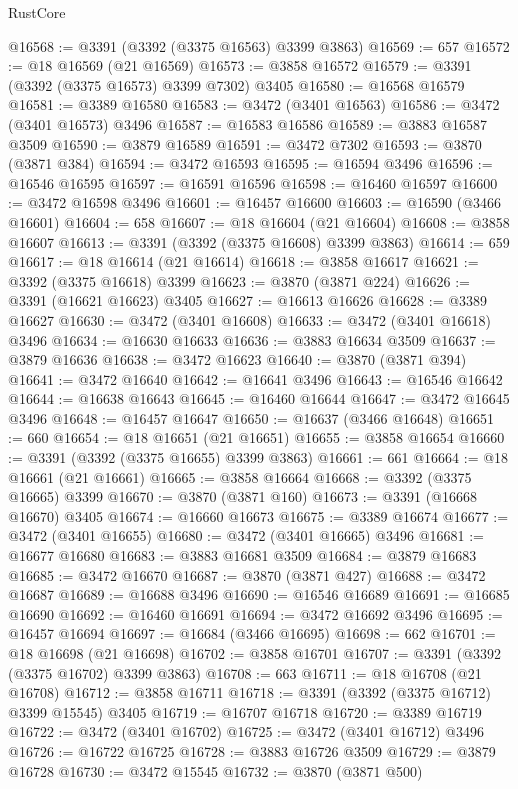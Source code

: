 \begin{lexlean}{RustCore}
\begin{coremodule}
@16568 := @3391 (@3392 (@3375 @16563) @3399 @3863)
@16569 := 657
@16572 := @18 @16569 (@21 @16569)
@16573 := @3858 @16572
@16579 := @3391 (@3392 (@3375 @16573) @3399 @7302) @3405
@16580 := @16568 @16579
@16581 := @3389 @16580
@16583 := @3472 (@3401 @16563)
@16586 := @3472 (@3401 @16573) @3496
@16587 := @16583 @16586
@16589 := @3883 @16587 @3509
@16590 := @3879 @16589
@16591 := @3472 @7302
@16593 := @3870 (@3871 @384)
@16594 := @3472 @16593
@16595 := @16594 @3496
@16596 := @16546 @16595
@16597 := @16591 @16596
@16598 := @16460 @16597
@16600 := @3472 @16598 @3496
@16601 := @16457 @16600
@16603 := @16590 (@3466 @16601)
@16604 := 658
@16607 := @18 @16604 (@21 @16604)
@16608 := @3858 @16607
@16613 := @3391 (@3392 (@3375 @16608) @3399 @3863)
@16614 := 659
@16617 := @18 @16614 (@21 @16614)
@16618 := @3858 @16617
@16621 := @3392 (@3375 @16618) @3399
@16623 := @3870 (@3871 @224)
@16626 := @3391 (@16621 @16623) @3405
@16627 := @16613 @16626
@16628 := @3389 @16627
@16630 := @3472 (@3401 @16608)
@16633 := @3472 (@3401 @16618) @3496
@16634 := @16630 @16633
@16636 := @3883 @16634 @3509
@16637 := @3879 @16636
@16638 := @3472 @16623
@16640 := @3870 (@3871 @394)
@16641 := @3472 @16640
@16642 := @16641 @3496
@16643 := @16546 @16642
@16644 := @16638 @16643
@16645 := @16460 @16644
@16647 := @3472 @16645 @3496
@16648 := @16457 @16647
@16650 := @16637 (@3466 @16648)
@16651 := 660
@16654 := @18 @16651 (@21 @16651)
@16655 := @3858 @16654
@16660 := @3391 (@3392 (@3375 @16655) @3399 @3863)
@16661 := 661
@16664 := @18 @16661 (@21 @16661)
@16665 := @3858 @16664
@16668 := @3392 (@3375 @16665) @3399
@16670 := @3870 (@3871 @160)
@16673 := @3391 (@16668 @16670) @3405
@16674 := @16660 @16673
@16675 := @3389 @16674
@16677 := @3472 (@3401 @16655)
@16680 := @3472 (@3401 @16665) @3496
@16681 := @16677 @16680
@16683 := @3883 @16681 @3509
@16684 := @3879 @16683
@16685 := @3472 @16670
@16687 := @3870 (@3871 @427)
@16688 := @3472 @16687
@16689 := @16688 @3496
@16690 := @16546 @16689
@16691 := @16685 @16690
@16692 := @16460 @16691
@16694 := @3472 @16692 @3496
@16695 := @16457 @16694
@16697 := @16684 (@3466 @16695)
@16698 := 662
@16701 := @18 @16698 (@21 @16698)
@16702 := @3858 @16701
@16707 := @3391 (@3392 (@3375 @16702) @3399 @3863)
@16708 := 663
@16711 := @18 @16708 (@21 @16708)
@16712 := @3858 @16711
@16718 := @3391 (@3392 (@3375 @16712) @3399 @15545) @3405
@16719 := @16707 @16718
@16720 := @3389 @16719
@16722 := @3472 (@3401 @16702)
@16725 := @3472 (@3401 @16712) @3496
@16726 := @16722 @16725
@16728 := @3883 @16726 @3509
@16729 := @3879 @16728
@16730 := @3472 @15545
@16732 := @3870 (@3871 @500)

\end{coremodule}
\end{lexlean}
